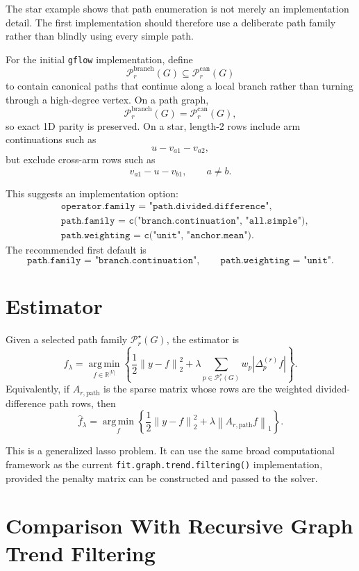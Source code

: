 \documentclass[11pt]{article}
\newcommand{\R}{\mathbb R}
\newcommand{\norm}[1]{\left\lVert #1 \right\rVert}
\newcommand{\argmin}{\operatorname*{arg\,min}}
\newcommand{\Path}{\mathcal P}
\begin{document}
The star example shows that path enumeration is not merely an implementation
detail.  The first implementation should therefore use a deliberate path
family rather than blindly using every simple path.

For the initial \texttt{gflow} implementation, define
\[
  \Path_r^{\mathrm{branch}}(G)
  \subseteq
  \Path_r^{\mathrm{can}}(G)
\]
to contain canonical paths that continue along a local branch rather than
turning through a high-degree vertex.  On a path graph,
\[
  \Path_r^{\mathrm{branch}}(G)
  =
  \Path_r^{\mathrm{can}}(G),
\]
so exact 1D parity is preserved.  On a star, length-2 rows include arm
continuations such as
\[
  u-v_{a1}-v_{a2},
\]
but exclude cross-arm rows such as
\[
  v_{a1}-u-v_{b1},\qquad a\ne b.
\]

This suggests an implementation option:
\[
\begin{split}
  &\texttt{operator.family = "path.divided.difference"},\\
  &\texttt{path.family = c("branch.continuation", "all.simple")},\\
  &\texttt{path.weighting = c("unit", "anchor.mean")}.
\end{split}
\]
The recommended first default is
\[
  \texttt{path.family = "branch.continuation"},
  \qquad
  \texttt{path.weighting = "unit"}.
\]

\section{Estimator}

Given a selected path family \(\Path_r^\star(G)\), the estimator is
\[
  \widehat f_\lambda
  =
  \argmin_{f\in\R^{|V|}}
  \left\{
    \frac12\norm{y-f}_2^2
    +
    \lambda
    \sum_{p\in \Path_r^\star(G)}
    w_p|\Delta^{(r)}_p f|
  \right\}.
\]
Equivalently, if \(A_{r,\mathrm{path}}\) is the sparse matrix whose rows are
the weighted divided-difference path rows, then
\[
  \widehat f_\lambda
  =
  \argmin_f
  \left\{
    \frac12\norm{y-f}_2^2
    +
    \lambda\norm{A_{r,\mathrm{path}}f}_1
  \right\}.
\]

This is a generalized lasso problem.  It can use the same broad computational
framework as the current \texttt{fit.graph.trend.filtering()} implementation,
provided the penalty matrix can be constructed and passed to the solver.

\section{Comparison With Recursive Graph Trend Filtering}
\end{document}
